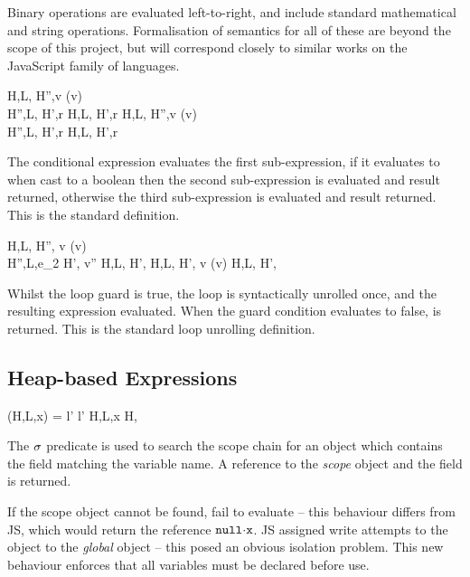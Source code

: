 \documentclass[a4paper,notitlepage]{report}
\begin{document}
  Binary operations are evaluated left-to-right, and include standard
  mathematical and string operations. Formalisation of semantics for all of these
  are beyond the scope of this project, but will correspond closely to similar
  works on the JavaScript family of languages.

  {H,L, \gevalsto H'',v \quad \istrue(v) \\
   H'',L, \evalsto H',r}
  {H,L, \evalsto H',r}
\qquad
  {H,L, \gevalsto H'',v \quad \isfalse(v) \\
   H'',L, \evalsto H',r}
  {H,L, \evalsto H',r}

  The conditional expression evaluates the first sub-expression, if it evaluates
  to  when cast to a boolean then the second
  sub-expression is evaluated and result returned, otherwise the third
  sub-expression is evaluated and result returned. This is the standard
  definition.


  {H,L, \gevalsto H'', v \quad \istrue(v) \\
   H'',L,e_2 \evalsto H', v''}
  {H,L, \evalsto H',\und}
\qquad
  {H,L, \gevalsto H', v \quad \isfalse(v)}
  {H,L, \evalsto H',\und}

  Whilst the loop guard is true, the loop is syntactically unrolled once, and
  the resulting expression evaluated. When the guard condition evaluates to
  false, \und is returned. This is the standard loop unrolling definition.

  \subsection{Heap-based Expressions}
  \label{sec:opsem:heapexprs}
    {\scope(H,L,x) = l' \quad l' \neq \nil}
    {H,L,\js x \evalsto H, }

  The $\sigma$ predicate is used to search the scope chain for an object which
  contains the field matching the variable name. A reference to the \emph{scope}
  object and the field is returned.

  If the scope object cannot be found, fail to evaluate -- this
  behaviour differs from JS, which would return the reference
  $\fld{\nil}{\js{x}}$.  JS assigned write attempts to the \nil object to the
  \emph{global} object -- this posed an obvious isolation problem.
  This new behaviour enforces that all variables must be declared before use.
\end{document}
